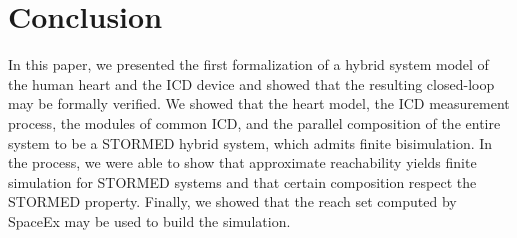 \section{Conclusion}
In this paper, we presented the first formalization of a hybrid system model of the human heart and the \ac{ICD} device and showed that the resulting closed-loop may be formally verified. 
We showed that the heart model, the \ac{ICD} measurement process, the modules of common \ac{ICD}, and the parallel composition of the entire system to be a STORMED hybrid system, which admits finite bisimulation.
In the process, we were able to show that approximate reachability yields finite simulation for STORMED systems and that certain composition respect the STORMED property.
Finally, we showed that the reach set computed by SpaceEx may be used to build the simulation.

